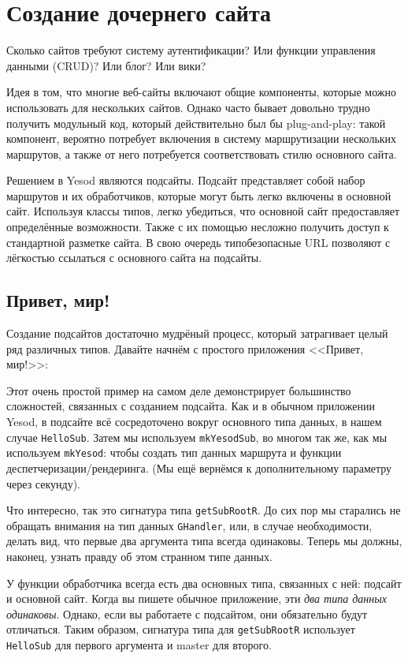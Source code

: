 \chapter{Создание дочернего сайта}\label{chap:subsite}

Сколько сайтов требуют систему аутентификации? Или функции управления данными (CRUD)? Или блог? Или вики?

Идея в том, что многие веб-сайты включают общие компоненты, которые можно использовать для нескольких сайтов. Однако часто бывает довольно трудно получить модульный код, который действительно был бы plug-and-play: такой компонент, вероятно потребует включения в систему маршрутизации нескольких маршрутов, а также от него потребуется соответствовать стилю основного сайта.

Решением в Yesod являются подсайты. Подсайт представляет собой набор маршрутов и их обработчиков, которые могут быть легко включены в основной сайт. Используя классы типов, легко убедиться, что основной сайт предоставляет определённые возможности. Также с их помощью несложно получить доступ к стандартной разметке сайта. В свою очередь типобезопасные URL позволяют с лёгкостью ссылаться с основного сайта на подсайты.

\section{Привет, мир!}

Создание подсайтов достаточно мудрёный процесс, который затрагивает целый ряд различных типов. Давайте начнём с простого приложения <<Привет, мир!>>:

Этот очень простой пример на самом деле демонстрирует большинство сложностей, связанных с созданием подсайта. Как и в обычном приложении Yesod, в подсайте всё сосредоточено вокруг основного типа данных, в нашем случае \lstinline!HelloSub!. Затем мы используем \lstinline!mkYesodSub!, во многом так же, как мы используем \lstinline!mkYesod!: чтобы создать тип данных маршрута и функции деспетчеризации/рендеринга. (Мы ещё вернёмся к дополнительному параметру через секунду).

Что интересно, так это сигнатура типа \lstinline!getSubRootR!. До сих пор мы старались не обращать внимания на тип данных \lstinline!GHandler!, или, в случае необходимости, делать вид, что первые два аргумента типа всегда одинаковы. Теперь мы должны, наконец, узнать правду об этом странном типе данных.

У функции обработчика всегда есть два основных типа, связанных с ней: подсайт и основной сайт. Когда вы пишете обычное приложение, эти \emph{два типа данных одинаковы}.  Однако, если вы работаете с подсайтом, они обязательно будут отличаться. Таким образом, сигнатура типа для \lstinline!getSubRootR! использует \lstinline!HelloSub! для первого аргумента и master для второго.

